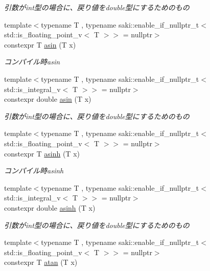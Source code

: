 \begin{DoxyCompactItemize}
\begin{DoxyCompactList}\small\item\em 引数がint型の場合に、戻り値をdouble型にするためのもの \end{DoxyCompactList}\item 
{\footnotesize template$<$typename T , typename saki\+::enable\+\_\+if\+\_\+nullptr\+\_\+t$<$ std\+::is\+\_\+floating\+\_\+point\+\_\+v$<$ T $>$$>$  = nullptr$>$ }\\constexpr T \mbox{\hyperlink{namespacesaki_a63f2b40515cd62b037dade64aa8465db}{asin}} (T x)
\begin{DoxyCompactList}\small\item\em コンパイル時asin \end{DoxyCompactList}\item 
{\footnotesize template$<$typename T , typename saki\+::enable\+\_\+if\+\_\+nullptr\+\_\+t$<$ std\+::is\+\_\+integral\+\_\+v$<$ T $>$$>$  = nullptr$>$ }\\constexpr double \mbox{\hyperlink{namespacesaki_aac285debedd1f53761a838c0e4f57af0}{asin}} (T x)
\begin{DoxyCompactList}\small\item\em 引数がint型の場合に、戻り値をdouble型にするためのもの \end{DoxyCompactList}\item 
{\footnotesize template$<$typename T , typename saki\+::enable\+\_\+if\+\_\+nullptr\+\_\+t$<$ std\+::is\+\_\+floating\+\_\+point\+\_\+v$<$ T $>$$>$  = nullptr$>$ }\\constexpr T \mbox{\hyperlink{namespacesaki_ab097a2d600f313b6bdd3099e61a10b9e}{asinh}} (T x)
\begin{DoxyCompactList}\small\item\em コンパイル時asinh \end{DoxyCompactList}\item 
{\footnotesize template$<$typename T , typename saki\+::enable\+\_\+if\+\_\+nullptr\+\_\+t$<$ std\+::is\+\_\+integral\+\_\+v$<$ T $>$$>$  = nullptr$>$ }\\constexpr double \mbox{\hyperlink{namespacesaki_aac840ca5d9b98ac0a8c5b15752f02072}{asinh}} (T x)
\begin{DoxyCompactList}\small\item\em 引数がint型の場合に、戻り値をdouble型にするためのもの \end{DoxyCompactList}\item 
{\footnotesize template$<$typename T , typename saki\+::enable\+\_\+if\+\_\+nullptr\+\_\+t$<$ std\+::is\+\_\+floating\+\_\+point\+\_\+v$<$ T $>$$>$  = nullptr$>$ }\\constexpr T \mbox{\hyperlink{namespacesaki_a524b9439c745f69bd8a8b681b03b4b01}{atan}} (T x)

\end{DoxyCompactItemize}
